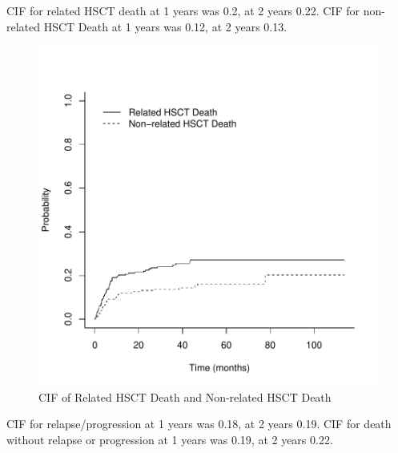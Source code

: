 \documentclass[a4paper,11pt] {article}
\begin{document}
\pagebreak
CIF for related HSCT death at 1 years was 0.2, at 2 years  0.22.
CIF for non-related HSCT Death at 1 years was 0.12, at 2 years  0.13.
\begin{figure}[h]
\begin{center}
\includegraphics{Rapport-fig5}
\end{center}
\caption{CIF of Related HSCT Death and Non-related HSCT Death}
\label{fig5}
\end{figure}

\pagebreak
CIF for relapse/progression at 1 years was 0.18, at 2 years  0.19.
CIF for death without relapse or progression at 1 years was 0.19, at 2 years  0.22. 
\end{document}
